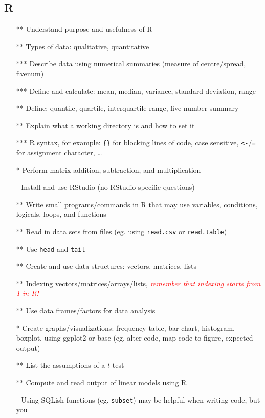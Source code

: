 \documentclass[12pt]{article}%
\begin{document}
\subsection*{R}
\begin{itemize}
 \setlength{\itemsep}{1pt}%
    \setlength{\parskip}{1pt}
\item[**] Understand purpose and usefulness of R
\item[**] Types of data: qualitative, quantitative
\item[***] Describe data using numerical summaries (measure of centre/spread, fivenum)
\item[***] Define and calculate: mean, median, variance, standard deviation, range
\item[**] Define: quantile, quartile, interquartile range, five number summary
\item[**] Explain what a  working directory is and how to set it %
\item[***] {\sf R} syntax, for example: \verb|{}| for blocking lines of code, case sensitive, \verb|<-|/\verb|=| for assignment character,  \dots
\item[*] Perform matrix addition, subtraction, and multiplication
\item[-] Install and use RStudio (no RStudio specific questions)
\item[**] Write small programs/commands in {\sf R} that may use variables, conditions, logicals, loops, and functions
\item[**] Read in data sets from files (eg. using {\tt read.csv} or {\tt read.table})
\item[**] Use {\tt head} and {\tt tail}%
\item[**] Create and use data structures: vectors, matrices, lists
\item[**] Indexing vectors/matrices/arrays/lists, \textcolor{red}{\it remember that indexing starts from 1 in {\sf R}!}
\item[**] Use data frames/factors for data analysis
\item[*] Create graphs/visualizations: frequency table, bar chart, histogram, boxplot, %
using ggplot2 or base (eg. alter code, map code to figure, expected output)
\item[**] List the assumptions of a $t$-test
\item[**] Compute and read output of linear models using R
\item[-] Using SQLish functions (eg. {\tt subset}) may be helpful when writing code, but you %

\end{itemize}
\end{document}
